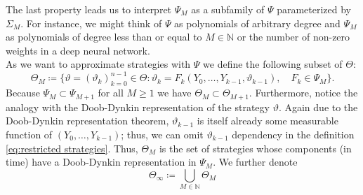 \documentclass[11pt,a4paper,twoside,openany]{report}
\theoremstyle{plain} %
\theoremstyle{definition} %
\theoremstyle{remark} %
\begin{document}
The last property leads us to interpret \(\Psi_M\) as a subfamily of \(\Psi\) parameterized by \(\Sigma_M\). For instance, we might think of \(\Psi\) as polynomials of arbitrary degree and \(\Psi_M\) as polynomials of degree less than or equal to \(M\in\mathbb{N}\) or the number of non-zero weights in a deep neural network.  
\\
As we want to approximate strategies with \(\Psi\) we define the following subset of \(\Theta\):
\begin{equation}\label{eq:restricted strategies}
    \Theta_M\coloneqq\{\vartheta=(\vartheta_k)_{k=0}^{n-1}\in\Theta:\vartheta_k=F_k(Y_0,\dots,Y_{k-1},\vartheta_{k-1}),\quad F_k\in\Psi_M\}.
\end{equation}
Because \(\Psi_M\subset\Psi_{M+1}\) for all \(M\geq1\) we have \(\Theta_M\subset\Theta_{M+1}\).
Furthermore, notice the analogy with the Doob-Dynkin representation of the strategy \(\vartheta\). Again due to the Doob-Dynkin representation theorem, \(\vartheta_{k-1}\) is itself already some measurable function of \((Y_0,\dots,Y_{k-1})\); thus, we can omit \(\vartheta_{k-1}\) dependency in the definition \cref{eq:restricted strategies}. Thus, \(\Theta_M\) is the set of strategies whose components (in time) have a Doob-Dynkin representation in \(\Psi_M\). 
We further denote
\begin{equation}
    \Theta_{\infty}\coloneqq \bigcup_{M\in\mathbb{N}}\Theta_M
\end{equation}
\end{document}
